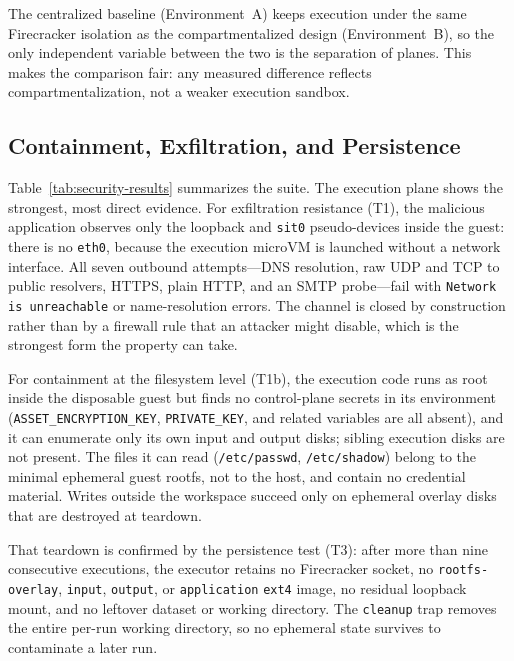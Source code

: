 The centralized baseline (Environment~A) keeps execution under the same
Firecracker isolation as the compartmentalized design (Environment~B), so the
only independent variable between the two is the separation of planes. This makes
the comparison fair: any measured difference reflects compartmentalization, not a
weaker execution sandbox.

\subsection{Containment, Exfiltration, and Persistence}

Table~\ref{tab:security-results} summarizes the suite. The execution plane shows
the strongest, most direct evidence. For exfiltration resistance (T1), the
malicious application observes only the loopback and \texttt{sit0} pseudo-devices
inside the guest: there is no \texttt{eth0}, because the execution microVM is
launched without a network interface. All seven outbound attempts---DNS
resolution, raw UDP and TCP to public resolvers, HTTPS, plain HTTP, and an SMTP
probe---fail with \texttt{Network is unreachable} or name-resolution errors. The
channel is closed by construction rather than by a firewall rule that an attacker
might disable, which is the strongest form the property can take.

For containment at the filesystem level (T1b), the execution code runs as root
inside the disposable guest but finds no control-plane secrets in its environment
(\texttt{ASSET\_ENCRYPTION\_KEY}, \texttt{PRIVATE\_KEY}, and related variables are
all absent), and it can enumerate only its own input and output disks; sibling
execution disks are not present. The files it can read
(\texttt{/etc/passwd}, \texttt{/etc/shadow}) belong to the minimal ephemeral guest
rootfs, not to the host, and contain no credential material. Writes outside the
workspace succeed only on ephemeral overlay disks that are destroyed at teardown.

That teardown is confirmed by the persistence test (T3): after more than nine
consecutive executions, the executor retains no Firecracker socket, no
\texttt{rootfs-overlay}, \texttt{input}, \texttt{output}, or \texttt{application}
\texttt{ext4} image, no residual loopback mount, and no leftover dataset or
working directory. The \texttt{cleanup} trap removes the entire per-run working
directory, so no ephemeral state survives to contaminate a later run.

